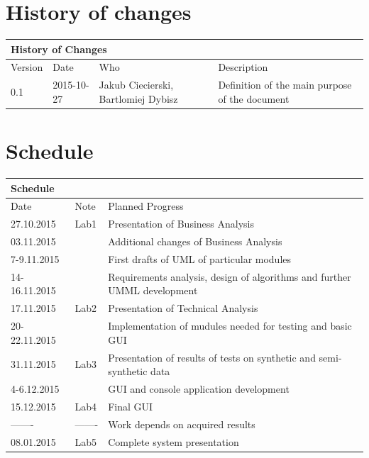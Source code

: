 \documentclass{article}
\begin{document}
\section*{History of changes}

\begin{table}[h]
\hspace*{-4.1cm}
\large
\begin{tabular}{|l|l|l|l|}
\hline
\multicolumn{4}{|l|}{\cellcolor[HTML]{C0C0C0}History of Changes} \\ \hline
Version         & Date         & Who        & Description        \\ \hline

0.1         
& 2015-10-27         
& Jakub Ciecierski, Bartlomiej Dybisz
& Definition of the main purpose of the document       \\ \hline
\end{tabular}
\end{table}


\section*{Schedule}

\begin{table}[h]
\centering
\hspace*{-4.1cm}
\large
\begin{tabular}{|l|l|l|}
\hline
\multicolumn{3}{|l|}{\cellcolor[HTML]{C0C0C0}Schedule} \\ \hline
Date         & Note        & Planned Progress          \\ \hline

27.10.2015   & Lab1    & Presentation of Business Analysis   \\ \hline
03.11.2015   &    & Additional changes of Business Analysis   \\ \hline
7-9.11.2015   &     & First drafts of UML of particular modules   \\ \hline
14-16.11.2015   &     & Requirements analysis, design of algorithms and further UMML development \\ \hline
17.11.2015   &  Lab2   & Presentation of Technical Analysis   \\ \hline
20-22.11.2015   &     & Implementation of mudules needed for testing and basic GUI   \\ \hline
31.11.2015   & Lab3    & Presentation of results of tests on synthetic and semi-synthetic data  \\ \hline
4-6.12.2015   &     & GUI and console application development  \\ \hline
15.12.2015   & Lab4    & Final GUI  \\ \hline
-------  & -------    & Work depends on acquired results  \\ \hline
08.01.2015  & Lab5    & Complete system presentation  \\ \hline
\end{tabular}
\end{table}
\end{document}
